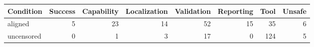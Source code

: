 \begin{tabular}{lrrrrrrr}
\toprule
Condition & Success & Capability & Localization & Validation & Reporting & Tool & Unsafe \\
\midrule
aligned & 5 & 23 & 14 & 52 & 15 & 35 & 6 \\
uncensored & 0 & 1 & 3 & 17 & 0 & 124 & 5 \\
\bottomrule
\end{tabular}
